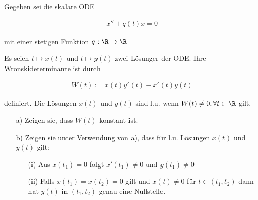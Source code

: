 \begin{exercise}
  Gegeben sei die skalare ODE

  \begin{align*}
    x'' + q(t)x = 0
  \end{align*}

  mit einer stetigen Funktion $q: \R \rightarrow \R$

  Es seien $t \mapsto x(t)$ und $t \mapsto y(t)$ zwei Lösunger der ODE.
  Ihre Wronskideterminante ist durch

  \begin{align*}
    W(t) := x(t)y'(t)-x'(t)y(t)
  \end{align*}

  definiert. Die Lösungen $x(t)$ und $y(t)$ sind l.u. wenn
  $W(t) \neq 0, \forall t \in \R$ gilt.

  \begin{itemize}
    \item[a)] Zeigen sie, dass $W(t)$ konstant ist.
    \item[b)] Zeigen sie unter Verwendung von a), dass für l.u. Lösungen
    $x(t)$ und $y(t)$ gilt:
    \begin{itemize}
      \item[(i)] Aus $x(t_1) = 0$ folgt $x'(t_1) \neq 0$ und $y(t_1) \neq 0$
      \item[(ii)] Falls $x(t_1)=x(t_2)=0$ gilt und $x(t) \neq 0$ für
      $t \in (t_1 , t_2 )$ dann hat $y(t)$ in $(t_1 , t_2 )$ genau eine Nullstelle.
    \end{itemize}
  \end{itemize}

\end{exercise}

